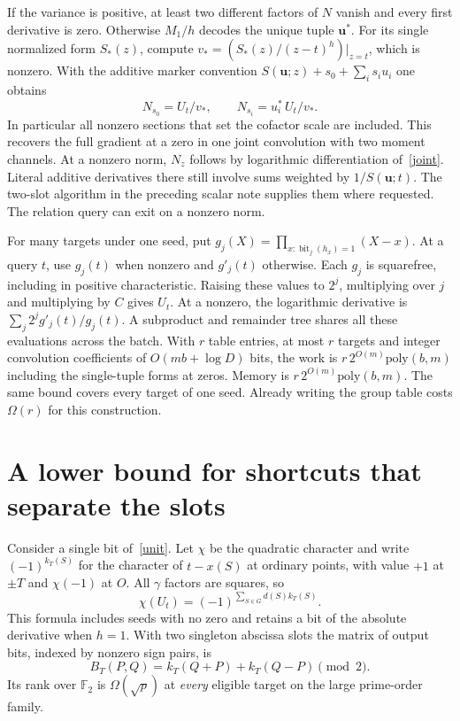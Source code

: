 \documentclass[11pt]{article}
\newcommand{\F}{\mathbb F}
\begin{document}
If the variance is positive, at least two different factors of
$N$ vanish and every first derivative is zero. Otherwise $M_1/h$
decodes the unique tuple $\mathbf u^*$. For its single normalized
form $S_*(z)$, compute $v_*=(S_*(z)/(z-t)^h)|_{z=t}$, which is
nonzero. With the additive marker convention
$S(\mathbf u;z)+s_0+\sum_i s_i u_i$ one obtains
\[
 N_{s_0}=U_t/v_*,\qquad N_{s_i}=u_i^*\,U_t/v_*.
\]
In particular all nonzero sections that set the cofactor scale
are included. This recovers the full gradient at a zero in one
joint convolution with two moment channels. At a nonzero norm,
$N_z$ follows by logarithmic differentiation of~\eqref{joint}.
Literal additive derivatives there still involve sums weighted by
$1/S(\mathbf u;t)$. The two-slot algorithm in the preceding
scalar note supplies them where requested. The relation query
can exit on a nonzero norm.

For many targets under one seed, put
$g_j(X)=\prod_{x:\operatorname{bit}_j(h_x)=1}(X-x)$. At a query
$t$, use $g_j(t)$ when nonzero and $g'_j(t)$ otherwise.
Each $g_j$ is squarefree, including in positive characteristic.
Raising these values to $2^j$, multiplying over $j$ and multiplying
by $C$ gives $U_t$. At a nonzero, the logarithmic derivative is
$\sum_j2^jg'_j(t)/g_j(t)$. A subproduct and remainder tree shares
all these evaluations across the batch. With $r$ table entries,
at most $r$ targets and integer convolution coefficients of
$O(mb+\log D)$ bits, the work is
$r\,2^{O(m)}\mathrm{poly}(b,m)$ including the single-tuple forms
at zeros. Memory is $r\,2^{O(m)}\mathrm{poly}(b,m)$. The same
bound covers every target of one seed. Already writing the group
table costs $\Omega(r)$ for this construction.

\section{A lower bound for shortcuts that separate the slots}
Consider a single bit of~\eqref{unit}. Let $\chi$ be the quadratic
character and write $(-1)^{k_T(S)}$ for the character of $t-x(S)$
at ordinary points, with value $+1$ at $\pm T$ and $\chi(-1)$ at
$O$. All $\gamma$ factors are squares, so
\[
 \chi(U_t)=(-1)^{\sum_{S\in G}d(S) k_T(S)} .
\]
This formula includes seeds with no zero and retains a bit of the
absolute derivative when $h=1$. With two singleton abscissa slots
the matrix of output bits, indexed by nonzero sign pairs, is
\[
 B_T(P,Q)=k_T(Q+P)+k_T(Q-P)\pmod2.
\]
Its rank over $\F_2$ is $\Omega(\sqrt p)$ at \emph{every} eligible
target on the large prime-order family.
\end{document}
